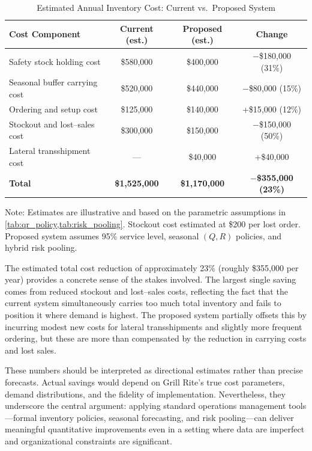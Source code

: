 \documentclass[12pt,a4paper]{article}
\begin{document}
\begin{table}[H]
  \centering
  \caption{Estimated Annual Inventory Cost: Current vs.\ Proposed System}
  \label{tab:cost_comparison}
  \begin{tabular}{lccc}
    \toprule
    Cost Component & Current (est.) & Proposed (est.) & Change \\
    \midrule
    Safety stock holding cost     & \$580{,}000 & \$400{,}000 & $-$\$180{,}000 (31\%) \\
    Seasonal buffer carrying cost & \$520{,}000 & \$440{,}000 & $-$\$80{,}000 (15\%) \\
    Ordering and setup cost       & \$125{,}000 & \$140{,}000 & +\$15{,}000 (12\%) \\
    Stockout and lost--sales cost & \$300{,}000 & \$150{,}000 & $-$\$150{,}000 (50\%) \\
    Lateral transshipment cost    & ---          & \$40{,}000  & +\$40{,}000 \\
    \midrule
    \textbf{Total}                & \textbf{\$1{,}525{,}000} & \textbf{\$1{,}170{,}000} & \textbf{$-$\$355{,}000 (23\%)} \\
    \bottomrule
  \end{tabular}

  \vspace{0.3em}
  \footnotesize{Note: Estimates are illustrative and based on the parametric assumptions in \cref{tab:qr_policy,tab:risk_pooling}. Stockout cost estimated at \$200 per lost order. Proposed system assumes 95\% service level, seasonal $(Q,R)$ policies, and hybrid risk pooling.}
\end{table}

The estimated total cost reduction of approximately 23\% (roughly \$355{,}000 per year) provides a concrete sense of the stakes involved. The largest single saving comes from reduced stockout and lost--sales costs, reflecting the fact that the current system simultaneously carries too much total inventory and fails to position it where demand is highest. The proposed system partially offsets this by incurring modest new costs for lateral transshipments and slightly more frequent ordering, but these are more than compensated by the reduction in carrying costs and lost sales.

These numbers should be interpreted as directional estimates rather than precise forecasts. Actual savings would depend on Grill Rite's true cost parameters, demand distributions, and the fidelity of implementation. Nevertheless, they underscore the central argument: applying standard operations management tools---formal inventory policies, seasonal forecasting, and risk pooling---can deliver meaningful quantitative improvements even in a setting where data are imperfect and organizational constraints are significant.
\end{document}
